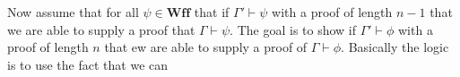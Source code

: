 \documentclass[12pt]{article}
\newcommand{\mc}[1]{\mathcal{#1}}
\begin{document}
Now assume that for all $\psi \in \textbf{Wff}$ that if $\Gamma' \vdash \psi$ with a proof of length $n-1$ that we are able to supply a proof that $\Gamma \vdash \psi$. The goal is to show  if $\Gamma' \vdash \phi$ with a proof of length $n$ that ew are able to supply a proof of $\Gamma \vdash \phi$. Basically the logic is to use the fact that we can 



\end{document}

